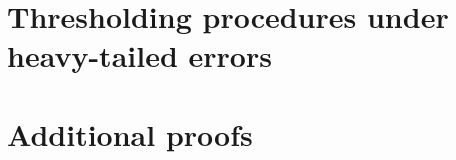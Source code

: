 \section{Thresholding procedures under heavy-tailed errors}
\label{suppsec:heavy-tailed}



\section{Additional proofs}
\label{suppsec:proofs}





